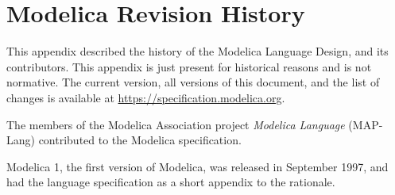 \chapter{Modelica Revision History}\label{modelica-revision-history}

This appendix described the history of the Modelica Language Design, and its contributors.
This appendix is just present for historical reasons and is not normative.
The current version, all versions of this document, and the list of changes is available at \url{https://specification.modelica.org}.

The members of the Modelica Association project \emph{Modelica Language} (MAP-Lang) contributed to the Modelica specification.

Modelica 1, the first version of Modelica, was released in September 1997, and had the language specification as a short appendix to the rationale.
